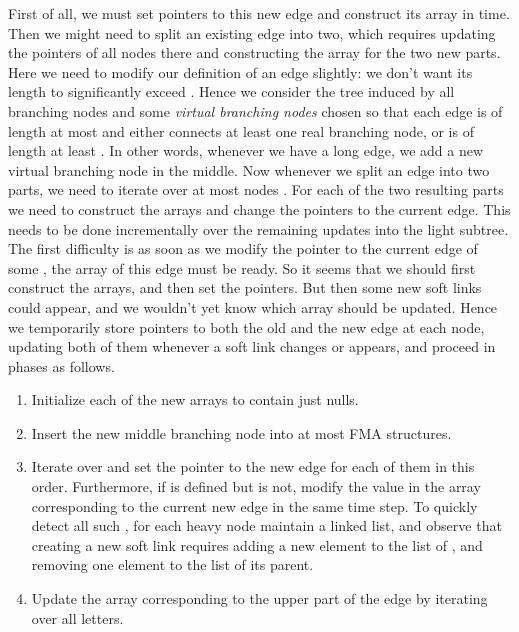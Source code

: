 \documentclass[11pt,onecolumn,final]{article} \usepackage{a4}
\theoremstyle{plain}
\theoremstyle{remark}
\begin{document}
First of all, we must set pointers to this new edge and construct its array in  time. Then we might need to split an existing edge into two, which requires updating the pointers of all nodes there and constructing the array for the two new parts. Here we need to modify our definition of an edge slightly: we don't want its length to significantly exceed . Hence we consider the tree induced by all branching nodes and some \emph{virtual branching nodes} chosen so that each edge is of length at most  and either connects at least one real branching node, or is of length at least . In other words, whenever we have a long edge, we add a new virtual branching node in the middle. Now whenever we split an edge into two parts, we need to iterate over at most  nodes . For each of the two resulting parts we need to construct the arrays and change the pointers to the current edge. This needs to be done incrementally over the remaining  updates into the light subtree. The first difficulty is as soon as we modify the pointer to the current edge of some , the array of this edge must be ready. So it seems that we should first construct the arrays, and then set the pointers. But then some new soft links could appear, and we wouldn't yet know which array should be updated. Hence we temporarily store pointers to both the old and the new edge at each node, updating both of them whenever a soft link changes or appears, and proceed in phases as follows.

\begin{enumerate}
\item Initialize each of the new arrays to contain just nulls.
\item Insert the new middle branching node into at most  FMA structures.
\item Iterate over  and set the pointer to the new edge for each of them in this order. Furthermore, if  is defined but  is not, modify the value in the array corresponding to the current new edge in the same time step. To quickly detect all such , for each heavy node maintain a linked list, and observe that creating a new soft link  requires adding a new element to the list of , and removing one element to the list of its parent.
\item Update the array corresponding to the upper part of the edge by iterating over all letters.
\end{enumerate}
\end{document}
